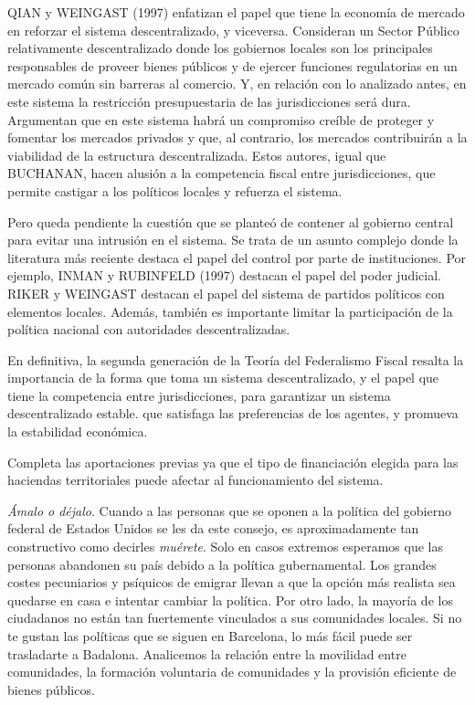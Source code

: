 \documentclass[10pt,a4paper]{article}
\begin{document}
QIAN y WEINGAST (1997) enfatizan el papel que tiene la economía de mercado en reforzar el sistema descentralizado, y viceversa. Consideran un Sector Público relativamente descentralizado donde los gobiernos locales son los principales responsables de proveer bienes públicos y de ejercer funciones regulatorias en un mercado común sin barreras al comercio. Y, en relación con lo analizado antes, en este sistema la restricción presupuestaria de las jurisdicciones será dura. Argumentan que en este sistema habrá un compromiso creíble de proteger y fomentar los mercados privados y que, al contrario, los mercados contribuirán a la viabilidad de la estructura descentralizada. Estos autores, igual que BUCHANAN, hacen alusión a la competencia fiscal entre jurisdicciones, que permite castigar a los políticos locales y refuerza el sistema.

Pero queda pendiente la cuestión que se planteó de contener al gobierno central para evitar una intrusión en el sistema. Se trata de un asunto complejo donde la literatura más reciente destaca el papel del control por parte de instituciones. Por ejemplo, INMAN y RUBINFELD (1997) destacan el papel del poder judicial. RIKER y WEINGAST destacan el papel del sistema de partidos políticos con elementos locales. Además, también es importante limitar la participación de la política nacional con autoridades descentralizadas.

En definitiva, la segunda generación de la Teoría del Federalismo Fiscal resalta la importancia de la forma que toma un sistema descentralizado, y el papel que tiene la competencia entre jurisdicciones, para garantizar un sistema descentralizado estable. que satisfaga las preferencias de los agentes, y promueva la estabilidad económica.

Completa las aportaciones previas ya que el tipo de financiación elegida para las haciendas territoriales puede afectar al funcionamiento del sistema.

\textit{Ámalo o déjalo}. Cuando a las personas que se oponen a la política del gobierno federal de Estados Unidos se les da este consejo, es aproximadamente tan constructivo como decirles \textit{muérete}. Solo en casos extremos esperamos que las personas abandonen su país debido a la política gubernamental. Los grandes costes pecuniarios y psíquicos de emigrar llevan a que la opción más realista sea quedarse en casa e intentar cambiar la política. Por otro lado, la mayoría de los ciudadanos no están tan fuertemente vinculados a sus comunidades locales. Si no te gustan las políticas que se siguen en Barcelona, lo más fácil puede ser trasladarte a Badalona. Analicemos la relación entre la movilidad entre comunidades, la formación voluntaria de comunidades y la provisión eficiente de bienes públicos.
\end{document}
